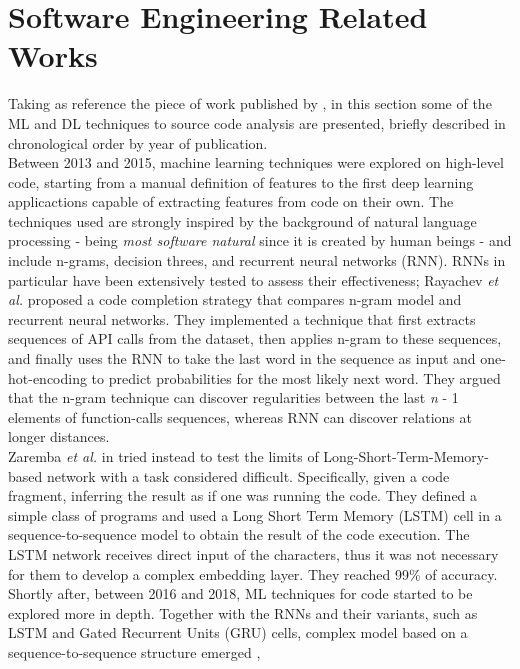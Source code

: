 \section{Software Engineering Related Works}
Taking as reference the piece of work published by \cite{barchi2022deep}, in this section some of the ML and
DL techniques to source code analysis are presented, briefly described in chronological order by 
year of publication.\\ 
Between 2013 and 2015, machine learning techniques were explored on high-level code, starting from a manual 
definition of features to the first deep learning applicactions capable of extracting features from code on their own.
The techniques used are strongly inspired by the background of natural language processing 
- being \textit{most software natural} \cite{hindle2016naturalness} since it is created by human beings - and include n-grams, decision threes, 
and recurrent neural networks (RNN). RNNs in particular have been extensively tested to assess their effectiveness;
Rayachev \textit{et al.} \cite{raychev2014code} proposed a code completion strategy that compares n-gram model and recurrent neural networks. 
They implemented a technique that first extracts sequences of API calls from the dataset, then applies n-gram to these sequences, and finally uses the RNN 
to take the last word in the sequence as input and one-hot-encoding to predict probabilities for the most likely next word.
They argued that the n-gram technique can discover regularities between the last \textit{n} - 1 elements of function-calls sequences, whereas RNN can discover
relations at longer distances.\\
Zaremba \textit{et al.} in \cite{zaremba2014learning} tried instead to test the limits of Long-Short-Term-Memory-based network with a task 
considered difficult. Specifically, given a code fragment, inferring the result as if one was running the code. They 
defined a simple class of programs and used a Long Short Term Memory (LSTM) cell in a sequence-to-sequence model to obtain the result of the code execution. 
The LSTM network receives direct input of the characters, thus it was not necessary for them to develop a complex 
embedding layer. They reached 99\% of accuracy. \\
\newline
Shortly after, between 2016 and 2018, ML techniques for code started to be explored more in depth. Together with the RNNs and their variants,
such as LSTM and Gated Recurrent Units (GRU) cells, complex model based on a sequence-to-sequence structure emerged \cite{iyer2016summarizing},
